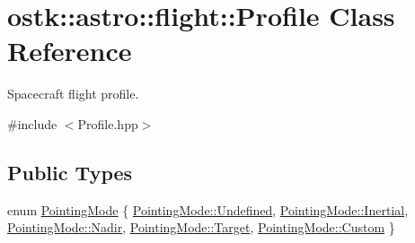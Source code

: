 \hypertarget{classostk_1_1astro_1_1flight_1_1_profile}{}\section{ostk\+:\+:astro\+:\+:flight\+:\+:Profile Class Reference}
\label{classostk_1_1astro_1_1flight_1_1_profile}


Spacecraft flight profile.  




{\ttfamily \#include $<$Profile.\+hpp$>$}

\subsection*{Public Types}
\begin{DoxyCompactItemize}
\item 
enum \hyperlink{classostk_1_1astro_1_1flight_1_1_profile_a01d9e77f30ba7131c70e81d12b237ea4}{Pointing\+Mode} \{ \newline
\hyperlink{classostk_1_1astro_1_1flight_1_1_profile_a01d9e77f30ba7131c70e81d12b237ea4aec0fc0100c4fc1ce4eea230c3dc10360}{Pointing\+Mode\+::\+Undefined}, 
\hyperlink{classostk_1_1astro_1_1flight_1_1_profile_a01d9e77f30ba7131c70e81d12b237ea4a4d5cc7bc19ef3d1ab992ba044dc0ebe4}{Pointing\+Mode\+::\+Inertial}, 
\hyperlink{classostk_1_1astro_1_1flight_1_1_profile_a01d9e77f30ba7131c70e81d12b237ea4ae749bd0537284ea6e823e91c9edcb528}{Pointing\+Mode\+::\+Nadir}, 
\hyperlink{classostk_1_1astro_1_1flight_1_1_profile_a01d9e77f30ba7131c70e81d12b237ea4ac41a31890959544c6523af684561abe5}{Pointing\+Mode\+::\+Target}, 
\newline
\hyperlink{classostk_1_1astro_1_1flight_1_1_profile_a01d9e77f30ba7131c70e81d12b237ea4a90589c47f06eb971d548591f23c285af}{Pointing\+Mode\+::\+Custom}
 \}
\end{DoxyCompactItemize}
